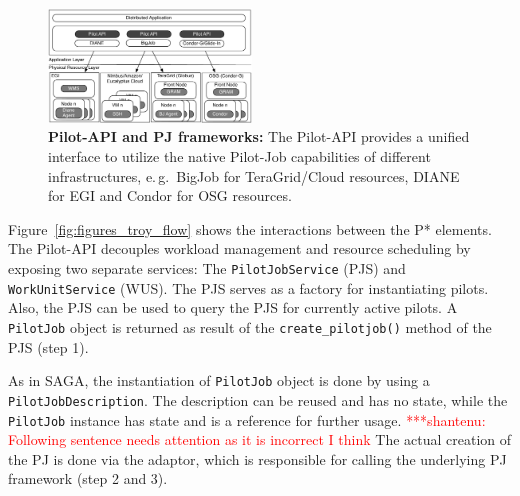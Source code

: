 \documentclass[conference,final]{IEEEtran}
\newcommand{\jhanote}[1]{ {\textcolor{red} { ***shantenu: #1 }}}
\newcommand{\alnote}[1]{ {\textcolor{blue} { ***andrel: #1 }}}
\newcommand{\alnote}[1]{}
\newcommand{\jhanote}[1]{}
\newcommand{\upp}{\vspace*{-0.5em}}
\begin{document}
\begin{figure}[t]
    \centering
\upp
    \includegraphics[width=0.48\textwidth]{figures/distributed_pilot_job.pdf}
    \caption{\textbf{Pilot-API and PJ frameworks:} The Pilot-API provides 
      a unified interface to utilize the native Pilot-Job capabilities of
      different infrastructures, e.\,g.\ BigJob for TeraGrid/Cloud
      resources, DIANE for EGI and Condor for OSG resources.
	\upp\upp\upp}
    \label{fig:figures_distributed_pilot_job}
\end{figure}



Figure~\ref{fig:figures_troy_flow} shows the interactions between the
P* elements. The Pilot-API decouples workload management and resource
scheduling by exposing two separate services: The
\texttt{PilotJobService} (PJS) and \texttt{WorkUnitService} (WUS). The
PJS serves as a factory for instantiating pilots. Also, the PJS can be
used to query the PJS for currently active pilots.  A
\texttt{PilotJob} object is returned as result of the
\texttt{create\_pilotjob()} method of the PJS (step 1).

As in SAGA, the instantiation of \texttt{PilotJob} object is done by
using a \texttt{PilotJobDescription}. The description can be reused
and has no state, while the \texttt{PilotJob} instance has state and
is a reference for further usage. \jhanote{Following sentence needs
  attention as it is incorrect I think} The actual creation of the PJ
is done via the adaptor, which is responsible for calling the
underlying PJ framework (step 2 and 3).
\end{document}

